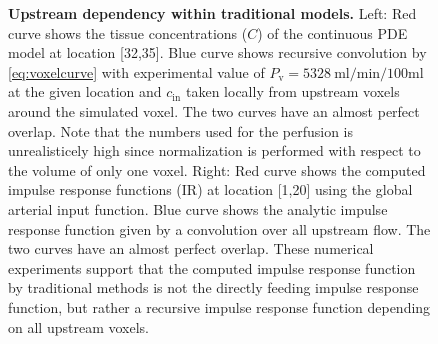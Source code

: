 \documentclass[10pt]{article}
\begin{document}
\begin{figure}[!h]
\caption{{\bf Upstream dependency within traditional models.}
Left: Red curve shows the tissue concentrations ($C$) of the continuous PDE model at location [32,35]. Blue curve shows recursive convolution by \eqref{eq:voxelcurve} with experimental value of $P_{\mathrm{v}}=\SI{5328}{\milli\litre\per\minute\per100\milli\litre}$ at the given location and $c_{\mathrm{in}}$ taken locally from upstream voxels around the simulated voxel. The two curves have an almost perfect overlap. Note that the numbers used for the perfusion is unrealisticely high since normalization is performed with respect to the volume of only one voxel. Right: Red curve shows the computed impulse response functions (IR) at location [1,20] using the global arterial input function. Blue curve shows the analytic impulse response function given by a convolution over all upstream flow. The two curves have an almost perfect overlap. These numerical experiments support that the computed impulse response function by traditional methods is not the directly feeding impulse response function, but rather a recursive impulse response function depending on all upstream voxels.}
\label{fig:VoxelComp}
\end{figure}


\end{document}
